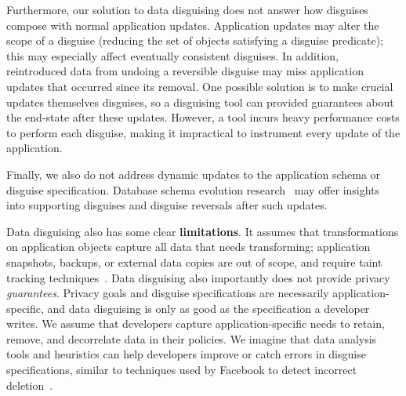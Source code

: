 %
Furthermore, our solution to data disguising does not answer how disguises compose with normal
application updates. 
%
Application updates may alter the scope of a disguise (\ie reducing the set of
objects satisfying a disguise predicate); this may especially affect eventually
consistent disguises. 
%
In addition, reintroduced data from undoing a reversible disguise may miss application updates that
occurred since its removal. One possible solution is to make crucial updates themselves disguises,
so a disguising tool can provided guarantees about the end-state after these updates.
However, a tool incurs heavy performance costs to perform each disguise, making it
impractical to instrument every update of the application.

Finally, we also do not address dynamic updates to the application schema or disguise specification.
%
Database schema evolution research~\cite{schema:evo} may offer insights
into supporting disguises and disguise reversals after such updates.

Data disguising also has some clear \textbf{limitations}.
It assumes that transformations on application objects capture all data that needs transforming;
application snapshots, backups, or external data copies are out of scope, and require
\eg taint tracking techniques~\cite{schengendb}.
Data disguising also importantly does not provide privacy \emph{guarantees}.
%
Privacy goals and disguise specifications are necessarily application-specific, and 
data disguising is only as good as the specification a developer writes. We assume
that developers capture application-specific needs to retain, remove, and decorrelate data in
their policies.
We imagine that data analysis tools and heuristics can help developers improve or catch
errors in disguise specifications, similar to techniques used by Facebook to detect incorrect
deletion~\cite{delf}.
%
%



